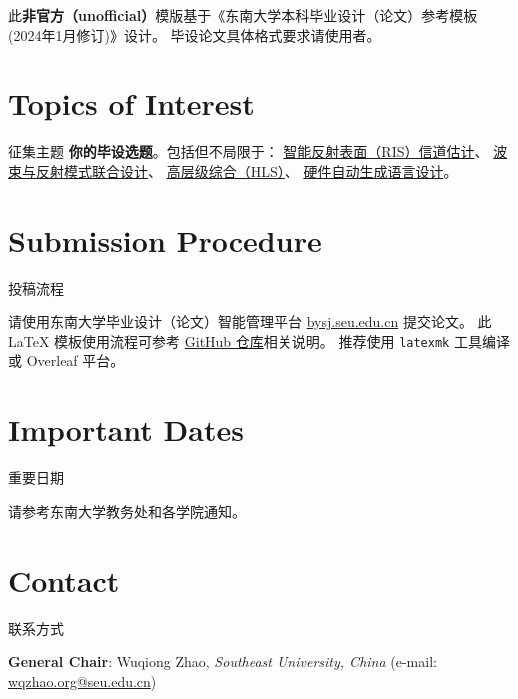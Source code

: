 \documentclass[a4paper, 12pt]{article}
\newcommand\secondColor{seuYellow}
\begin{document}
\begin{warning}
  此\textbf{非官方（unofficial）}模版基于《东南大学本科毕业设计（论文）参考模板 (2024年1月修订)》设计。
  毕设论文具体格式要求请使用者。
\end{warning}

\section{Topics of Interest}{征集主题}
\textbf{你的毕设选题}。包括但不局限于：
\href{https://wqzhao.org/pub/zhao2023ompl}{智能反射表面（RIS）信道估计}、
\href{https://wqzhao.org/pub/you2023beam}{波束与反射模式联合设计}、
\href{https://wqzhao.org/pub/zhao2023flexible}{高层级综合（HLS）}、
\href{https://wqzhao.org/pub/zhao2023automatic}{硬件自动生成语言设计}。

\section{Submission Procedure}{投稿流程}

请使用东南大学毕业设计（论文）智能管理平台 \href{https://bysj.seu.edu.cn}{\ttfamily bysj.seu.edu.cn} 提交论文。
此 \LaTeX{} 模板使用流程可参考 \href{https://github.com/Teddy-van-Jerry/seuthesis2024b}{GitHub 仓库}相关说明。
推荐使用 \texttt{latexmk} 工具编译或 Overleaf 平台。

\section{Important Dates}{重要日期}

请参考东南大学教务处和各学院通知。

\section{Contact}{联系方式}

\noindent
\textbf{General Chair}: Wuqiong Zhao, \textit{Southeast University, China} (e-mail: \href{mailto:me@wqzhao.org}{\ttfamily wqzhao.org@seu.edu.cn})
\end{document}
